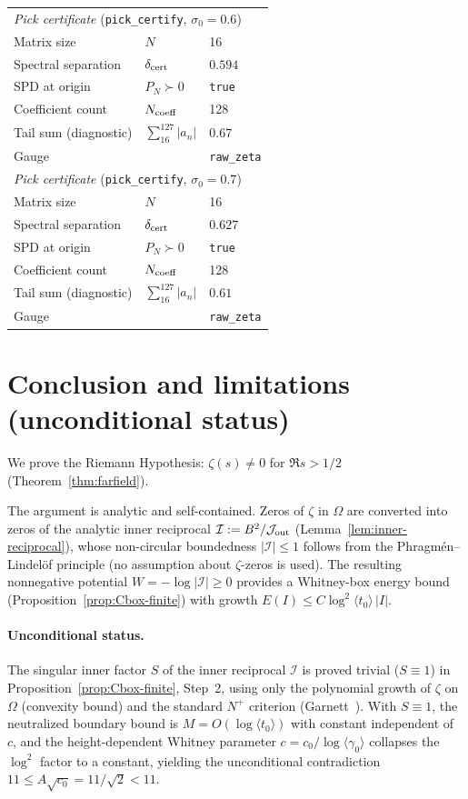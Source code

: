 \documentclass[11pt]{amsart}
\theoremstyle{definition}
\theoremstyle{remark}
\newcommand{\angles}[1]{\langle #1\rangle}
\begin{document}
\begin{table}[H]
\begin{tabular}{l l l}
\midrule
\multicolumn{3}{l}{\textit{Pick certificate} (\texttt{pick\_certify}, $\sigma_0 = 0.6$)} \\
\quad Matrix size & $N$ & 16 \\
\quad Spectral separation & $\delta_{\rm cert}$ & $0.594$ \\
\quad SPD at origin & $P_N \succ 0$ & \texttt{true} \\
\quad Coefficient count & $N_{\rm coeff}$ & 128 \\
\quad Tail sum (diagnostic) & $\sum_{16}^{127}|a_n|$ & $0.67$ \\
\quad Gauge & & \texttt{raw\_zeta} \\
\midrule
\multicolumn{3}{l}{\textit{Pick certificate} (\texttt{pick\_certify}, $\sigma_0 = 0.7$)} \\
\quad Matrix size & $N$ & 16 \\
\quad Spectral separation & $\delta_{\rm cert}$ & $0.627$ \\
\quad SPD at origin & $P_N \succ 0$ & \texttt{true} \\
\quad Coefficient count & $N_{\rm coeff}$ & 128 \\
\quad Tail sum (diagnostic) & $\sum_{16}^{127}|a_n|$ & $0.61$ \\
\quad Gauge & & \texttt{raw\_zeta} \\
\bottomrule
\end{tabular}
\end{table}
\section*{Conclusion and limitations (unconditional status)}

We prove the Riemann Hypothesis:
$\zeta(s)\neq 0$ for $\Re s>1/2$ (Theorem~\ref{thm:farfield}).

The argument is analytic and self-contained.
Zeros of $\zeta$ in $\Omega$ are converted into zeros of the analytic inner reciprocal
$\mathcal I:=B^2/\mathcal J_{\rm out}$ (Lemma~\ref{lem:inner-reciprocal}),
whose non-circular boundedness $|\mathcal I|\le 1$ follows from the
Phragmén--Lindelöf principle (no assumption about $\zeta$-zeros is used).
The resulting nonnegative potential $W=-\log|\mathcal I|\ge 0$ provides
a Whitney-box energy bound (Proposition~\ref{prop:Cbox-finite})
with growth $E(I)\le C\log^2\!\angles{t_0}\,|I|$.
\paragraph{Unconditional status.}
The singular inner factor $S$ of the inner reciprocal $\mathcal I$ is proved trivial
($S\equiv 1$) in Proposition~\ref{prop:Cbox-finite}, Step~2,
using only the polynomial growth of $\zeta$ on $\Omega$ (convexity bound)
and the standard $N^+$ criterion (Garnett~\cite[Ch.~II]{GarnettBAF}).
With $S\equiv 1$, the neutralized boundary bound is $M=O(\log\angles{t_0})$
with constant independent of~$c$, and the height-dependent Whitney parameter
$c=c_0/\log\angles{\gamma_0}$ collapses the $\log^2$ factor to a constant,
yielding the unconditional contradiction $11\le A\sqrt{c_0}=11/\sqrt{2}<11$.
\end{document}

